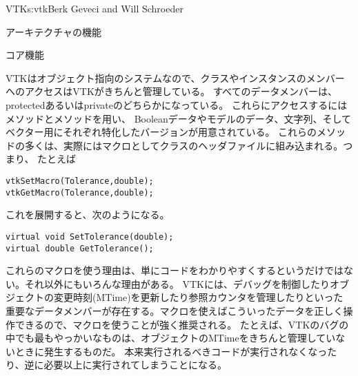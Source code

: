\begin{aosachapter}{VTK}{s:vtk}{Berk Geveci and Will Schroeder}
\begin{aosasect1}{アーキテクチャの機能}
\begin{aosasect2}{コア機能}

VTKはオブジェクト指向のシステムなので、クラスやインスタンスのメンバーへのアクセスはVTKがきちんと管理している。
すべてのデータメンバーは、protectedあるいはprivateのどちらかになっている。
これらにアクセスするにはメソッドとメソッドを用い、
Booleanデータやモデルのデータ、文字列、そしてベクター用にそれぞれ特化したバージョンが用意されている。
これらのメソッドの多くは、実際にはマクロとしてクラスのヘッダファイルに組み込まれる。つまり、
たとえば

\begin{verbatim}
vtkSetMacro(Tolerance,double);
vtkGetMacro(Tolerance,double);
\end{verbatim}

\noindent
これを展開すると、次のようになる。

\begin{verbatim}
virtual void SetTolerance(double);
virtual double GetTolerance();
\end{verbatim}

これらのマクロを使う理由は、単にコードをわかりやすくするというだけではない。それ以外にもいろんな理由がある。
VTKには、デバッグを制御したりオブジェクトの変更時刻(MTime)を更新したり参照カウンタを管理したりといった
重要なデータメンバーが存在する。マクロを使えばこういったデータを正しく操作できるので、マクロを使うことが強く推奨される。
たとえば、VTKのバグの中でも最もやっかいなものは、オブジェクトのMTimeをきちんと管理していないときに発生するものだ。
本来実行されるべきコードが実行されなくなったり、逆に必要以上に実行されてしまうことになる。


\end{aosasect2}
\end{aosasect1}
\end{aosachapter}

